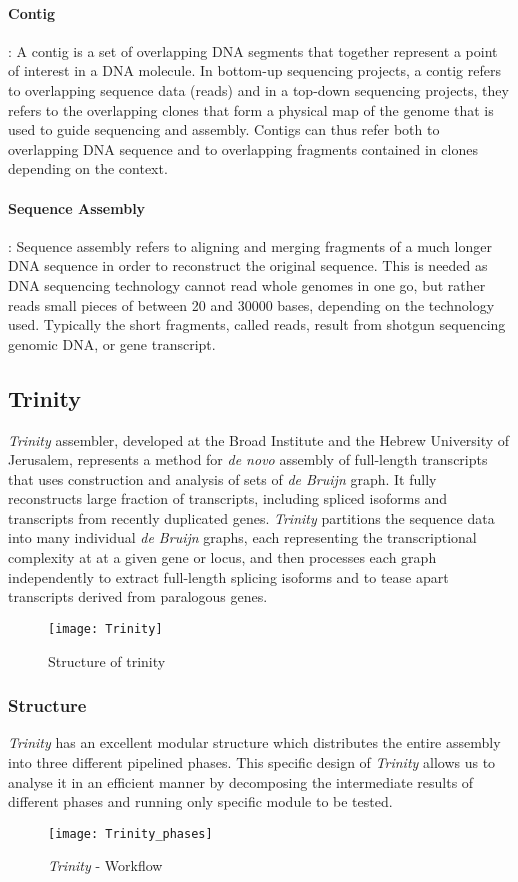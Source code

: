 \documentclass[plainarticle,zihtitle,english,final,hyperref,utf8]{zihpub}
\begin{document}
\paragraph{Contig}: A contig is a set of overlapping DNA segments that together represent a point of interest in a DNA molecule. In bottom-up sequencing projects, a contig refers to overlapping sequence data (reads) and in a top-down sequencing projects, they refers to the overlapping clones that form a physical map of the genome that is used to guide sequencing and assembly. Contigs can thus refer both to overlapping DNA sequence and to overlapping fragments contained in clones depending on the context.
\paragraph{Sequence Assembly}: Sequence assembly refers to aligning and merging fragments of a much longer DNA sequence in order to reconstruct the original sequence. This is needed as DNA sequencing technology cannot read whole genomes in one go, but rather reads small pieces of between 20 and 30000 bases, depending on the technology used. Typically the short fragments, called reads, result from shotgun sequencing genomic DNA, or gene transcript. 
\subsection{Trinity}
\emph{Trinity} assembler, developed at the Broad Institute and the Hebrew University of Jerusalem, represents a method for \emph{de novo} assembly of full-length transcripts that uses construction and analysis of sets of \emph{de Bruijn} graph. It fully reconstructs large fraction of transcripts, including spliced isoforms and transcripts from recently duplicated genes. \emph{Trinity} partitions the sequence data into many individual \emph{de Bruijn} graphs, each representing the transcriptional complexity at at a given gene or locus, and then processes each graph independently to extract full-length splicing isoforms and to tease apart transcripts derived from paralogous genes.  
\begin{figure}[h]
\center
\texttt{[image: Trinity]}
\caption{Structure of trinity}
\end{figure}
\subsubsection{Structure}
\emph{Trinity} has an excellent modular structure which distributes the entire assembly into three different pipelined phases. This specific design of \emph{Trinity} allows us to analyse it in an efficient manner by decomposing the intermediate results of different phases and running only specific module to be tested.
\begin{figure}[h]
\center
\texttt{[image: Trinity\_phases]}
\caption{\emph{Trinity} - Workflow}
\end{figure} 
\end{document}

